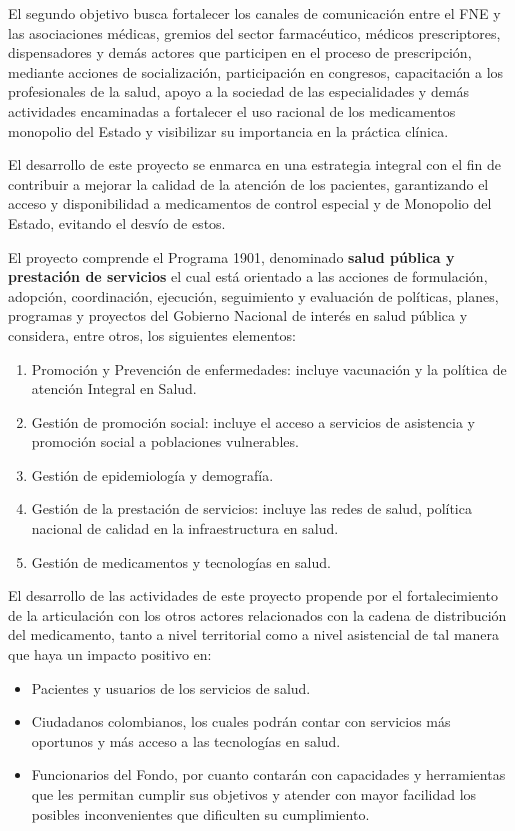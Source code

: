 \documentclass[
]{book}
\begin{document}
El segundo objetivo busca fortalecer los canales de comunicación entre el FNE y las asociaciones médicas, gremios del sector farmacéutico, médicos prescriptores, dispensadores y demás actores que participen en el proceso de prescripción, mediante acciones de socialización, participación en congresos, capacitación a los profesionales de la salud, apoyo a la sociedad de las especialidades y demás actividades encaminadas a fortalecer el uso racional de los medicamentos monopolio del Estado y visibilizar su importancia en la práctica clínica.

El desarrollo de este proyecto se enmarca en una estrategia integral con el fin de contribuir a mejorar la calidad de la atención de los pacientes, garantizando el acceso y disponibilidad a medicamentos de control especial y de Monopolio del Estado, evitando el desvío de estos.

El proyecto comprende el Programa 1901, denominado \textbf{salud pública y prestación de servicios} el cual está orientado a las acciones de formulación, adopción, coordinación, ejecución, seguimiento y evaluación de políticas, planes, programas y proyectos del Gobierno Nacional de interés en salud pública y considera, entre otros, los siguientes elementos:

\begin{enumerate}
\def\labelenumi{\arabic{enumi}.}
\item
  Promoción y Prevención de enfermedades: incluye vacunación y la política de atención Integral en Salud.
\item
  Gestión de promoción social: incluye el acceso a servicios de asistencia y promoción social a poblaciones vulnerables.
\item
  Gestión de epidemiología y demografía.
\item
  Gestión de la prestación de servicios: incluye las redes de salud, política nacional de calidad en la infraestructura en salud.
\item
  Gestión de medicamentos y tecnologías en salud.
\end{enumerate}

El desarrollo de las actividades de este proyecto propende por el fortalecimiento de la articulación con los otros actores relacionados con la cadena de distribución del medicamento, tanto a nivel territorial como a nivel asistencial de tal manera que haya un impacto positivo en:

\begin{itemize}
\item
  Pacientes y usuarios de los servicios de salud.
\item
  Ciudadanos colombianos, los cuales podrán contar con servicios más oportunos y más acceso a las tecnologías en salud.
\item
  Funcionarios del Fondo, por cuanto contarán con capacidades y herramientas que les permitan cumplir sus objetivos y atender con mayor facilidad los posibles inconvenientes que dificulten su cumplimiento.
\end{itemize}
\end{document}
